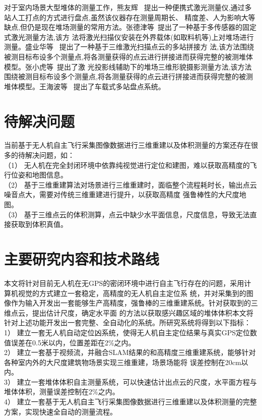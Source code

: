 对于室内场景大型堆体的测量工作，熊友辉~\cite{熊友辉2003便携式激光盘煤系统原理及应用} 提出一种便携式激光测量仪,通过多站人工打点的方式进行盘点,虽然该仪器存在测量周期长、
精度差、人为影响大等缺点,但仍是现在堆场测量的常用方法。张德津等~\cite{张德津2012基于多传感器集成的堆场激光测量技术应用}提出了一种基于多传感器的固定式激光测量方法,该方
法将激光扫描仪安装在外界载体(如取料机等)上对堆场进行测量。盛业华等~\cite{盛业华2010地面三维激光扫描点云的多站数据无缝拼接} 提出了一种基于三维激光扫描点云的多站拼接方
法,该方法围绕被测目标布设多个测量点,将各测量获得的点云进行拼接进而获得完整的被测堆体模型。张小虎等~\cite{张小虎2011投影轮廓线辅助下的堆场三维形貌摄影测量研究}提出了激
光投影线辅助下的堆场三维形貌摄影测量方法,该方法围绕被测目标布设多个测量点,将各测量获得的点云进行拼接进而获得完整的被测堆体模型。王海波等~\cite{王海波2013大型露天料场激光测量方法研究}
提出了车载式多站盘点系统。


\section{待解决问题}
\label{sec:1.3}
当前基于无人机自主飞行采集图像数据进行三维重建以及体积测量的方案还存在很多的待解决问题，如：\\
（1）	无人机在完全封闭环境中依靠纯视觉进行定位和建图，难以获取高精度的飞行位姿和地图信息。\\
（2）	基于三维重建算法对场景进行三维重建时，面临整个流程耗时长，输出点云噪音点大，需要对传统三维重建进行提升，以获取高精度
强鲁棒性的大尺度地图。\\
（3）	基于三维点云的体积测算，点云中缺少水平面信息，尺度信息，导致无法直接获取到体积真值。
\section{主要研究内容和技术路线}
\label{sec:1.4}
本文将针对目前无人机在无GPS的密闭环境中进行自主飞行存在的问题，采用计算机视觉的方式建立一套稳定，高精度的无人机自主定位系
统，并对采集到的图像作为输入开发出一套能够生产高精度，强鲁棒的三维重建系统。针对获取到的三维点云，提出估计尺度，确定水平面
的方法以获取感兴趣区域的堆体体积本文将针对上述功能开发出一套完整、全自动化的系统。所研究系统将得到以下指标：\\
1）	建立一套无人机自动定位凶系统，使得无人机自主定位结果与真实GPS定位数值误差在0.5米以内，位置差距在2$\%$之内。\\
2）	建立一套基于视频流，并融合SLAM结果的和高精度三维重建系统，能够针对各种室内外的大尺度建筑物场景实现三维重建，场景场能将
误差控制在20cm以内。\\
3）	建立一套堆体体积自主测量系统，可以快速估计出点云的尺度，水平面方程与堆体体积，测量误差控制在2$\%$之内。\\
4）	建立一套基于无人机自主飞行采集图像数据进行三维重建以及体积测量的完整方案，实现快速全自动的测量流程。

